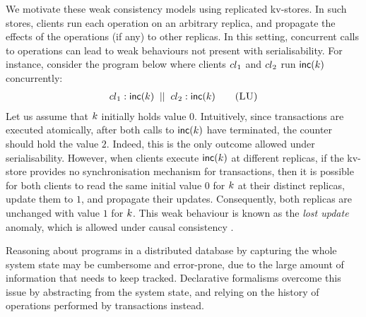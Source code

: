 We motivate these weak consistency models using replicated kv-stores. In
such stores, clients run each operation on an arbitrary replica, and
propagate the effects of the operations (if any) to other
replicas. In this setting, concurrent calls to 
operations can lead to weak behaviours not present with
serialisability.
For instance, consider the program below where clients ${cl}_1$ and 
${cl}_2$  run $\mathsf{inc}(k)$ concurrently: 
\begin{align}
	\cl_1: \ctrinc(\ke)
	\;\; || \;\;
	\cl_2: \ctrinc(\ke)
	\tag{\textsc{LU}}
	\label{prog:inc2}
\end{align}
Let us assume that  $k$ initially holds value $0$.
Intuitively, since transactions are executed atomically, after both
calls to $\mathsf{inc}(k)$ have terminated, the counter should hold 
the value $2$.
Indeed, this is the only outcome allowed under serialisability. 
However, when clients execute $\mathsf{inc}(k)$ at different replicas,
if the kv-store provides no synchronisation mechanism for transactions,
then it is possible for both clients to read the same initial value $0$ for $k$ at their
distinct replicas, update them to $1$, and propagate their updates. Consequently, both
replicas are unchanged with value  $1$ for $k$.
This weak behaviour is known as the \emph{lost update} anomaly, which
is  allowed under causal consistency \cite{cops,wren,redblue}.


Reasoning about programs in a distributed database by capturing the 
whole system state may be cumbersome and error-prone, 
due to the large amount of information that needs to keep tracked. 
Declarative formalisms overcome this issue by abstracting 
from the system state, and relying on the history of operations performed 
by transactions instead.

